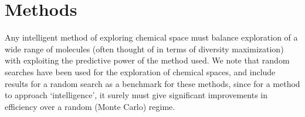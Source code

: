 \section{Methods}

Any intelligent method of exploring chemical space must balance exploration of a wide range of molecules (often thought of in terms of diversity maximization\cite{Blaney_1997,Wang_2009,Fitzgerald_2006,reker_activelearning_2015}) with exploiting the predictive power of the method used. We note that random searches have been used for the exploration of chemical spaces\cite{23548177}, and include results for a random search as a benchmark for these methods, since for a method to approach `intelligence', it surely must give significant improvements in efficiency over a random (Monte Carlo) regime.